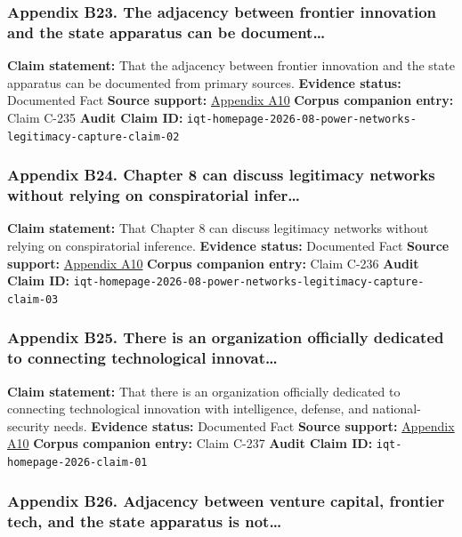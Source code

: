\documentclass[
  american,
  11pt,
  letterpaper,
]{article}
\begin{document}
\subsubsection{Appendix B23. The adjacency between frontier innovation
and the state apparatus can be
document\ldots{}}\label{appendix-b23-the-adjacency-between-frontier-innovation-and-the-state-apparatus-can-be-document}

\textbf{Claim statement:} That the adjacency between frontier innovation
and the state apparatus can be documented from primary sources.
\textbf{Evidence status:} Documented Fact \textbf{Source support:}
\hyperref[appendix-a10-in-q-tel]{Appendix A10} \textbf{Corpus companion
entry:} Claim C-235 \textbf{Audit Claim ID:}
\texttt{iqt-homepage-2026-08-power-networks-legitimacy-capture-claim-02}

\subsubsection{Appendix B24. Chapter 8 can discuss legitimacy networks
without relying on conspiratorial
infer\ldots{}}\label{appendix-b24-chapter-8-can-discuss-legitimacy-networks-without-relying-on-conspiratorial-infer}

\textbf{Claim statement:} That Chapter 8 can discuss legitimacy networks
without relying on conspiratorial inference. \textbf{Evidence status:}
Documented Fact \textbf{Source support:}
\hyperref[appendix-a10-in-q-tel]{Appendix A10} \textbf{Corpus companion
entry:} Claim C-236 \textbf{Audit Claim ID:}
\texttt{iqt-homepage-2026-08-power-networks-legitimacy-capture-claim-03}

\subsubsection{Appendix B25. There is an organization officially
dedicated to connecting technological
innovat\ldots{}}\label{appendix-b25-there-is-an-organization-officially-dedicated-to-connecting-technological-innovat}

\textbf{Claim statement:} That there is an organization officially
dedicated to connecting technological innovation with intelligence,
defense, and national-security needs. \textbf{Evidence status:}
Documented Fact \textbf{Source support:}
\hyperref[appendix-a10-in-q-tel]{Appendix A10} \textbf{Corpus companion
entry:} Claim C-237 \textbf{Audit Claim ID:}
\texttt{iqt-homepage-2026-claim-01}

\subsubsection{Appendix B26. Adjacency between venture capital, frontier
tech, and the state apparatus is
not\ldots{}}\label{appendix-b26-adjacency-between-venture-capital-frontier-tech-and-the-state-apparatus-is-not}
\end{document}
